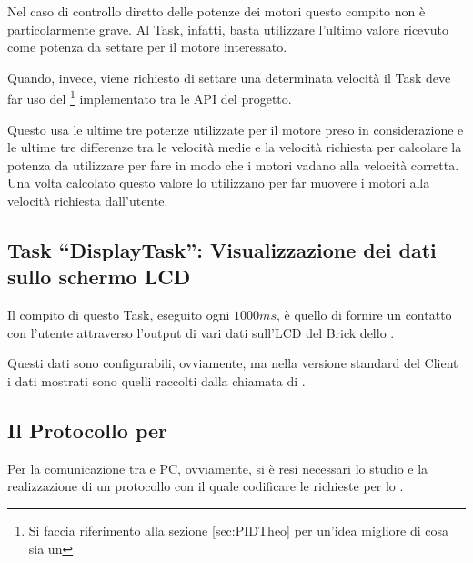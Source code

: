 Nel caso di controllo diretto delle potenze dei motori questo compito non è
particolarmente grave. Al Task, infatti, basta utilizzare l'ultimo valore
ricevuto come potenza da settare per il motore interessato.

Quando, invece, viene richiesto di settare una determinata velocità il Task
deve far uso del \PID{}\footnote{Si faccia riferimento alla sezione
\ref{sec:PIDTheo} per un'idea migliore di cosa sia un \PID{}} implementato
tra le API del progetto.

Questo usa le ultime tre potenze utilizzate per il motore preso in
considerazione e le ultime tre differenze tra le velocità medie e la
velocità richiesta per calcolare la potenza da utilizzare per fare in modo
che i motori vadano alla velocità corretta. Una volta calcolato questo
valore lo utilizzano per far muovere i motori alla velocità richiesta
dall'utente.

\subsection[Task ``DisplayTask'']{Task ``DisplayTask'': Visualizzazione dei
dati sullo schermo LCD}\label{sec:BROLCDS}
Il compito di questo Task, eseguito ogni $1000ms$, è quello di fornire un
contatto con l'utente attraverso l'output di vari dati sull'LCD del Brick
dello \SPAM{}.

Questi dati sono configurabili, ovviamente, ma nella versione standard del
Client \BROFist{} i dati mostrati sono quelli raccolti dalla chiamata di
\nxtOSEK{} .

\subsection{Il Protocollo per \BROFist{}}\label{sec:theProtocol}
Per la comunicazione tra \SPAM{} e PC, ovviamente, si è resi necessari lo
studio e la realizzazione di un protocollo con il quale codificare le
richieste per lo \SPAM{}.

